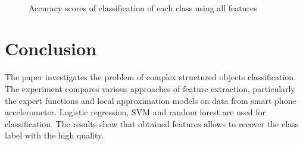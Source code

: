 \documentclass{llncs}
\begin{document}
\begin{figure}[!ht]
	\\
	\caption{Accuracy scores of classification of each class using all features}
	\label{fig::feature_union_results}
\end{figure}

\section{Conclusion}

The paper investigates the problem of complex structured objects classification.
The experiment compares various approaches of feature extraction, particularly the expert functions and local approximation models on data from smart phone accelerometer.
Logistic regression, SVM and random forest are used for classification. 
The results show that obtained features allows to recover the class label with the high quality.

\end{document}
